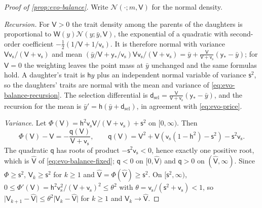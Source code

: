 \begin{proof}[Proof of \cref{prop:evo-balance}]
Write $\mathcal N(\cdot;m,\mathsf V)$ for the normal density.

\emph{Recursion.} For $\mathsf V>0$ the trait density among the parents of the daughters is proportional to $\mathsf W(y)\mathcal N(y;\bar y,\mathsf V)$, the exponential of a quadratic with second-order coefficient $-\frac12(1/\mathsf V+1/\mathsf v_{\mathrm s})$. It is therefore normal with variance $\mathsf V\mathsf v_{\mathrm s}/(\mathsf V+\mathsf v_{\mathrm s})$ and mean $(\bar y/\mathsf V+\mathsf y_\ast/\mathsf v_{\mathrm s})\mathsf V\mathsf v_{\mathrm s}/(\mathsf V+\mathsf v_{\mathrm s})=\bar y+\frac{\mathsf V}{\mathsf V+\mathsf v_{\mathrm s}}(\mathsf y_\ast-\bar y)$; for $\mathsf V=0$ the weighting leaves the point mass at $\bar y$ unchanged and the same formulas hold. A daughter's trait is $\mathsf hy$ plus an independent normal variable of variance $\mathsf s^2$, so the daughters' traits are normal with the mean and variance of \eqref{eq:evo-balance-recursion}. The selection differential is $\mathsf d_{\mathrm{sel}}=\frac{\mathsf V}{\mathsf V+\mathsf v_{\mathrm s}}(\mathsf y_\ast-\bar y)$, and the recursion for the mean is $\bar y'=\mathsf h(\bar y+\mathsf d_{\mathrm{sel}})$, in agreement with \eqref{eq:evo-price}.

\emph{Variance.} Let $\Phi(\mathsf V)=\mathsf h^2\mathsf v_{\mathrm s}\mathsf V/(\mathsf V+\mathsf v_{\mathrm s})+\mathsf s^2$ on $[0,\infty)$. Then
\begin{equation}\label{eq:evo-balance-q}
\Phi(\mathsf V)-\mathsf V=-\frac{\mathsf q(\mathsf V)}{\mathsf V+\mathsf v_{\mathrm s}},\qquad\mathsf q(\mathsf V)=\mathsf V^2+\mathsf V(\mathsf v_{\mathrm s}(1-\mathsf h^2)-\mathsf s^2)-\mathsf s^2\mathsf v_{\mathrm s}.
\end{equation}
The quadratic $\mathsf q$ has roots of product $-\mathsf s^2\mathsf v_{\mathrm s}<0$, hence exactly one positive root, which is $\hat{\mathsf V}$ of \eqref{eq:evo-balance-fixed}; $\mathsf q<0$ on $[0,\hat{\mathsf V})$ and $\mathsf q>0$ on $(\hat{\mathsf V},\infty)$. Since $\Phi\ge\mathsf s^2$, $\mathsf V_k\ge\mathsf s^2$ for $k\ge1$ and $\hat{\mathsf V}=\Phi(\hat{\mathsf V})\ge\mathsf s^2$. On $[\mathsf s^2,\infty)$, $0\le\Phi'(\mathsf V)=\mathsf h^2\mathsf v_{\mathrm s}^2/(\mathsf V+\mathsf v_{\mathrm s})^2\le\theta^2$ with $\theta=\mathsf v_{\mathrm s}/(\mathsf s^2+\mathsf v_{\mathrm s})<1$, so $\lvert\mathsf V_{k+1}-\hat{\mathsf V}\rvert\le\theta^2\lvert\mathsf V_k-\hat{\mathsf V}\rvert$ for $k\ge1$ and $\mathsf V_k\to\hat{\mathsf V}$.


\end{proof}
